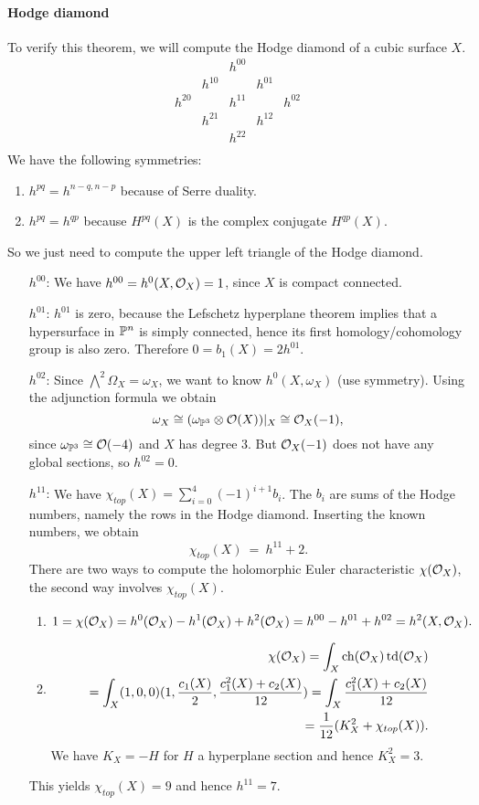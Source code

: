 \paragraph{Hodge diamond}
To verify this theorem, we will compute the Hodge diamond of a cubic surface $X$.
\[
\begin{array}{ccccc}
&&h^{00}&&\\
& h^{10} && h^{01} & \\
h^{20} && h^{11} && h^{02}\\
& h^{21} && h^{12} & \\
&&h^{22}&&\\
\end{array}
\]
We have the following symmetries:
\begin{enumerate}
\item $h^{pq}=h^{n-q,n-p}$ because of Serre duality.
\item $h^{pq}=h^{qp}$ because $H^{pq}(X)$ is the complex conjugate $H^{qp}(X)$.
\end{enumerate}
So we just need to compute the upper left triangle of the Hodge diamond.
\begin{itemize}
\item[$h^{00}$:] We have $h^{00}=h^0(X,\O_X)=1$, since $X$ is compact connected.
\item[$h^{01}$:] $h^{01}$ is zero, because the Lefschetz hyperplane theorem implies that a hypersurface in $\P^n$ is simply connected, hence its first homology/cohomology group is also zero. Therefore $0=b_1(X)=2h^{01}$.
\item[$h^{02}$:] Since $\bigwedge^2\Omega_X=\omega_X$, we want to know $h^0(X,\omega_X)$ (use symmetry). Using the adjunction formula we obtain
\[
\omega_X\cong (\omega_{\P^3}\otimes \O(X))|_{X}\cong \O_X(-1),
\]
since $\omega_{\P^3}\cong\O(-4)$ and $X$ has degree $3$. But $\O_X(-1)$ does not have any global sections, so $h^{02}=0$.
\item[$h^{11}$:] We have $\chi_{top}(X)=\sum_{i=0}^4(-1)^{i+1}b_i$. The $b_i$ are sums of the Hodge numbers, namely the rows in the Hodge diamond. Inserting the known numbers, we obtain
\[
\chi_{top}(X)\ =\ h^{11} + 2.
\]
There are two ways to compute the holomorphic Euler characteristic $\chi(\O_X)$, the second way involves $\chi_{top}(X)$.
\begin{enumerate}
\item 
\[
1=\chi(\O_X)=h^0(\O_X)-h^1(\O_X) + h^2(\O_X) = h^{00} - h^{01} + h^{02} = h^2(X,\O_X).
\]
\item 
\begin{align*}
\chi(\O_X) = \int_X\ch(\O_X)\td(\O_X)\\
=\int_X(1,0,0)(1,\frac{c_1(X)}{2},\frac{c_1^2(X) + c_2(X)}{12}) = \int_X\frac{c_1^2(X) + c_2(X)}{12}\\
=\frac{1}{12}(K_X^2+\chi_{top}(X)).
\end{align*}
We have $K_X=-H$ for $H$ a hyperplane section and hence $K_X^2=3$.
\end{enumerate}
This yields $\chi_{top}(X)=9$ and hence $h^{11}=7$.
\end{itemize}
